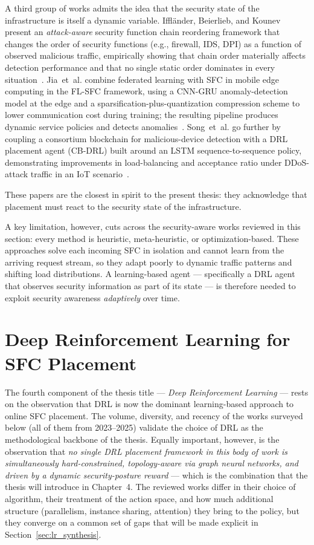 A third group of works admits the idea that the security state of the
infrastructure is itself a dynamic variable. Iffl\"ander, Beierlieb,
and Kounev present an \textit{attack-aware} security function chain
reordering framework that changes the order of security functions
(e.g., firewall, IDS, DPI) as a function of observed malicious
traffic, empirically showing that chain order materially affects
detection performance and that no single static order dominates in
every situation~\cite{ifflander_attack-aware_2024}. Jia~et~al.
combine federated learning with SFC in mobile edge computing in the
FL-SFC framework, using a CNN-GRU anomaly-detection model at the edge
and a sparsification-plus-quantization compression scheme to lower
communication cost during training; the resulting pipeline produces
dynamic service policies and detects
anomalies~\cite{jia_efficient_2025}. Song~et~al. go further by coupling
a consortium blockchain for malicious-device detection with a DRL
placement agent (CB-DRL) built around an LSTM sequence-to-sequence
policy, demonstrating improvements in load-balancing and acceptance
ratio under DDoS-attack traffic in an IoT
scenario~\cite{song_end--end_2025}.

These papers are the closest in spirit to the present thesis: they
acknowledge that placement must react to the security state of the
infrastructure.

A key limitation, however, cuts across the security-aware works reviewed
in this section: every method is heuristic, meta-heuristic, or
optimization-based. These approaches solve each incoming SFC in
isolation and cannot learn from the arriving request stream, so they
adapt poorly to dynamic traffic patterns and shifting load
distributions. A learning-based agent --- specifically a DRL agent
that observes security information as part of its state --- is
therefore needed to exploit security awareness
\emph{adaptively} over time.

\section{Deep Reinforcement Learning for SFC Placement}
\label{sec:lr_drl}

The fourth component of the thesis title --- \textit{Deep Reinforcement
Learning} --- rests on the observation that DRL is now the dominant
learning-based approach to online SFC placement. The volume, diversity,
and recency of the works surveyed below (all of them from 2023--2025)
validate the choice of DRL as the methodological backbone of the
thesis. Equally important, however, is the observation that \emph{no
single DRL placement framework in this body of work is simultaneously
hard-constrained, topology-aware via graph neural networks, and
driven by a dynamic security-posture reward} --- which is the combination
that the thesis will introduce in Chapter~4. The reviewed works differ
in their choice of algorithm, their treatment of the action space, and
how much additional structure (parallelism, instance sharing,
attention) they bring to the policy, but they converge on a common set
of gaps that will be made explicit in
Section~\ref{sec:lr_synthesis}.

